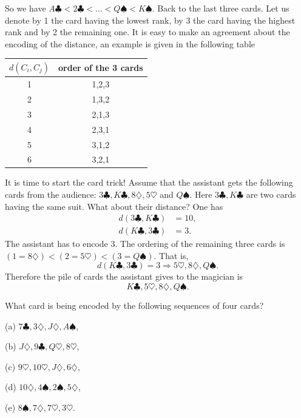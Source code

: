 \noindent So we have $A\clubsuit<2\clubsuit<\ldots<Q\spadesuit<K\spadesuit$. Back to the last three cards.
Let us denote by 1 the card having the lowest rank, by 3 the card having the highest rank and by 2 the remaining one.
It is easy to make an agreement about the encoding of the distance, an example is given in the following table
\begin{center}
\begin{tabular}{|c|c|}
\hline
$d(C_i,C_j)$ & order of the 3 cards\\
\hline
1 & 1,2,3\\
\hline
2 & 1,3,2\\
\hline
3 & 2,1,3\\
\hline
4 & 2,3,1\\
\hline
5 & 3,1,2\\
\hline
6 & 3,2,1\\
\hline
\end{tabular}
\end{center}
It is time to start the card trick! Assume that the assistant gets the following cards from the audience: $3\clubsuit, K\clubsuit, 8\diamondsuit, 5\heartsuit$ and $Q\spadesuit$.
Here $3\clubsuit, K\clubsuit$ are two cards having the same suit. What about their distance? One has 
\begin{align*}
d(3\clubsuit, K\clubsuit)&= 10,\\
d(K\clubsuit, 3\clubsuit)&= 3.
\end{align*}
The assistant has to encode 3. The ordering of the remaining three cards is $(1=8\diamondsuit)<(2=5\heartsuit)<(3=Q\spadesuit)$. That is, 
$$
d(K\clubsuit, 3\clubsuit)=3\Rightarrow 5\heartsuit, 8\diamondsuit, Q\spadesuit.
$$
Therefore the pile of cards the assistant gives to the magician is 
$$
K\clubsuit, 5\heartsuit, 8\diamondsuit, Q\spadesuit.
$$

\begin{exercise}\label{card-1}
What card is being encoded by the following sequences of four cards?

(a) $7\clubsuit,3\diamondsuit,J\diamondsuit,A\spadesuit$,

(b) $J\diamondsuit,9\clubsuit,Q\heartsuit,8\heartsuit$,

(c) $9\heartsuit,10\heartsuit,J\diamondsuit,6\diamondsuit$,

(d) $10\diamondsuit,4\spadesuit,2\spadesuit,5\diamondsuit$,

(e) $8\spadesuit,7\diamondsuit,7\heartsuit,3\heartsuit$.
\end{exercise}


